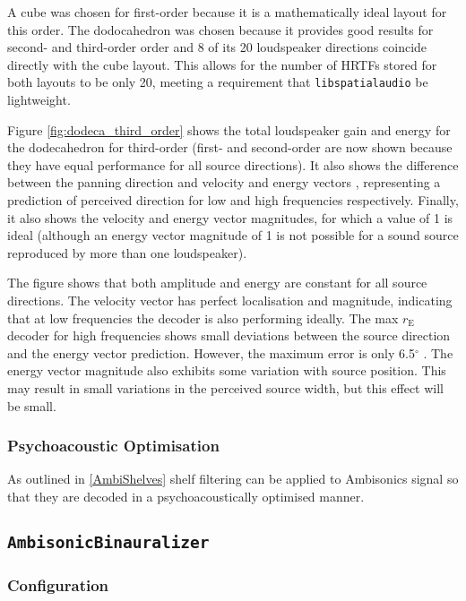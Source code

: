 \documentclass[12pt]{report}
\def\libspataud{\texttt{libspatialaudio}\xspace}
\def\deg{$^{\circ}$ }
\newcommand{\code}[1]{\texttt{#1}}
\begin{document}
A cube was chosen for first-order because it is a mathematically ideal layout for this order.
The dodocahedron was chosen because it provides good results for second- and third-order order and 8 of its 20 loudspeaker directions coincide directly with the cube layout.
This allows for the number of HRTFs stored for both layouts to be only 20, meeting a requirement that \libspataud be lightweight.

Figure \ref{fig:dodeca_third_order} shows the total loudspeaker gain and energy for the dodecahedron for third-order (first- and second-order are now shown because they have equal performance for all source directions).
It also shows the difference between the panning direction and velocity and energy vectors \cite{Gerzon1992a}, representing a prediction of perceived direction for low and high frequencies respectively.
Finally, it also shows the velocity and energy vector magnitudes, for which a value of 1 is ideal (although an energy vector magnitude of 1 is not possible for a sound source reproduced by more than one loudspeaker).

The figure shows that both amplitude and energy are constant for all source directions.
The velocity vector has perfect localisation and magnitude, indicating that at low frequencies the decoder is also performing ideally.
The max $r_{\mathrm{E}}$ decoder for high frequencies shows small deviations between the source direction and the energy vector prediction.
However, the maximum error is only 6.5\deg.
The energy vector magnitude also exhibits some variation with source position.
This may result in small variations in the perceived source width, but this effect will be small.

\subsubsection{Psychoacoustic Optimisation}

As outlined in \cref{AmbiShelves} shelf filtering can be applied to Ambisonics signal so that they are decoded in a psychoacoustically optimised manner.

\subsection{\code{AmbisonicBinauralizer}}

\subsubsection{Configuration}
\end{document}
